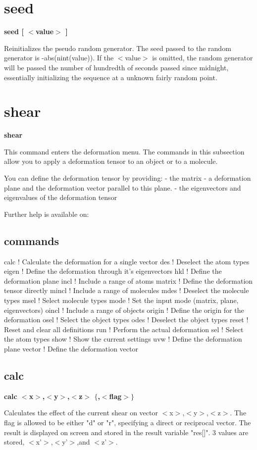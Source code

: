 \section{seed}
{\bf seed [ $ <$value$> $ ] \par }
\par
\vspace{3pt}
Reinitializes the pseudo random generator. The seed passed to the 
random generator is -abs(nint(value)). If the $ <$value$> $ is omitted, 
the random generator will be passed the number of hundredth of 
seconds passed since midnight, essentially initializing the sequence 
at a unknown fairly random point. 
\section{shear}
{\bf shear \par }
\par
\vspace{3pt}
This command enters the deformation menu. The commands in this 
subsection allow you to apply a deformation tensor to an object 
or to a molecule. 
\par
You can define the deformation tensor by providing: 
- the matrix 
- a deformation plane and the deformation vector parallel to this plane. 
- the eigenvectors and eigenvalues of the deformation tensor 
\par
Further help is available on: 
\subsection*{commands}
\begin{MacVerbatim}
calc    ! Calculate the deformation for a single vector
des     ! Deselect the atom types
eigen   ! Define the deformation through it's eigenvectors
hkl     ! Define the deformation plane
incl    ! Include a range of atoms
matrix  ! Define the deformation tensor directly
mincl   ! Include a range of molecules
mdes    ! Deselect the molecule types
msel    ! Select molecule types
mode    ! Set the input mode (matrix, plane, eigenvectors)
oincl   ! Include a range of objects
origin  ! Define the origin for the deformation
osel    ! Select the object types
odes    ! Deselect the object types
reset   ! Reset and clear all definitions
run     ! Perform the actual deformation
sel     ! Select the atom types
show    ! Show the current settings
uvw     ! Define the deformation plane
vector  ! Define the deformation vector
\end{MacVerbatim}
\subsection*{calc}
{\bf calc $ <$x$> $,$ <$y$> $,$ <$z$> $ $ \{$,$ <$flag$> $$\} $ \par }
\par
\vspace{3pt}
Calculates the effect of the current shear on vector $ <$x$> $,$ <$y$> $,$ <$z$> $. 
The flag is allowed to be either "d" or "r", specifying a direct 
or reciprocal vector. 
The result is displayed on screen and stored in the result 
variable "res[]". 3 values are stored, $ <$x'$> $,$ <$y'$> $,and $ <$z'$> $. 

